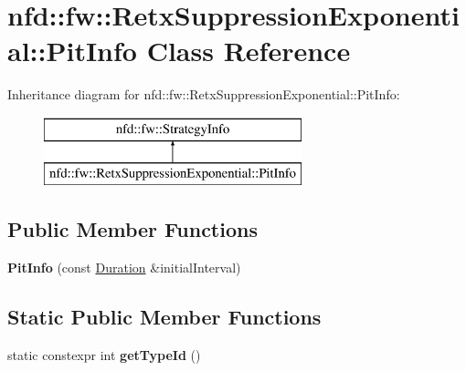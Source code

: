 \hypertarget{classnfd_1_1fw_1_1RetxSuppressionExponential_1_1PitInfo}{}\section{nfd\+:\+:fw\+:\+:Retx\+Suppression\+Exponential\+:\+:Pit\+Info Class Reference}
\label{classnfd_1_1fw_1_1RetxSuppressionExponential_1_1PitInfo}
Inheritance diagram for nfd\+:\+:fw\+:\+:Retx\+Suppression\+Exponential\+:\+:Pit\+Info\+:\begin{figure}[H]
\begin{center}
\leavevmode
\includegraphics[height=2.000000cm]{classnfd_1_1fw_1_1RetxSuppressionExponential_1_1PitInfo}
\end{center}
\end{figure}
\subsection*{Public Member Functions}
\begin{DoxyCompactItemize}
\item 
{\bfseries Pit\+Info} (const \hyperlink{classnfd_1_1fw_1_1RetxSuppressionExponential_a8bf25d84d9b6756133a9c0822e0a4f7b}{Duration} \&initial\+Interval)\hypertarget{classnfd_1_1fw_1_1RetxSuppressionExponential_1_1PitInfo_a92a2422bcf826fb5f81f090d70dd5495}{}\label{classnfd_1_1fw_1_1RetxSuppressionExponential_1_1PitInfo_a92a2422bcf826fb5f81f090d70dd5495}

\end{DoxyCompactItemize}
\subsection*{Static Public Member Functions}
\begin{DoxyCompactItemize}
\item 
static constexpr int {\bfseries get\+Type\+Id} ()\hypertarget{classnfd_1_1fw_1_1RetxSuppressionExponential_1_1PitInfo_a1b91d1ec90908be32dc4342a6f1f1124}{}\label{classnfd_1_1fw_1_1RetxSuppressionExponential_1_1PitInfo_a1b91d1ec90908be32dc4342a6f1f1124}

\end{DoxyCompactItemize}

